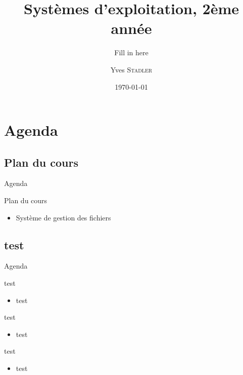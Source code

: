 
\title{Systèmes d'exploitation, 2ème année}
\subtitle{Fill in here}

\author{Yves \textsc{Stadler}}

\date{\today}



\begin{frame}
\titlepage
\end{frame}

\def\sectitle{Agenda}
\section{\sectitle}
\def\subsectitle{Plan du cours}
\subsection{\subsectitle}

\begin{frame}{\sectitle}
\begin{block}{\subsectitle}
\begin{itemize}
\item Système de gestion des fichiers
\end{itemize}
\end{block}
\end{frame}

\def\subsectitle{test}
\subsection{\subsectitle}


\begin{frame}{\sectitle}
\begin{alertblock}{\subsectitle}
\begin{itemize}
\item test 
\end{itemize}
\end{alertblock}

\begin{exampleblock}{test}
\begin{itemize}
\item test
\end{itemize}

\end{exampleblock}

\begin{block}{test}
\begin{itemize}
\item test
\end{itemize}

\end{block}

\end{frame}



